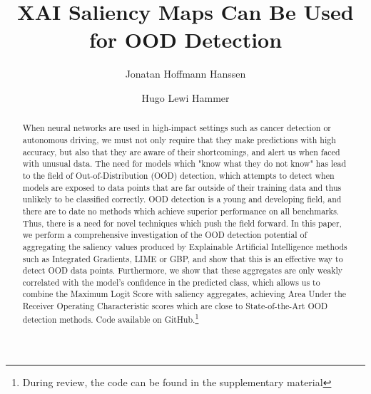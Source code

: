 \documentclass[runningheads]{llncs}
\begin{document}
\title{XAI Saliency Maps Can Be Used for OOD Detection} 



\author{%
    Jonatan Hoffmann Hanssen
    \and Hugo Lewi Hammer 
}




\maketitle


\begin{abstract}
    When neural networks are used in high-impact settings such as cancer detection or autonomous driving, we must not only require that they make predictions with high accuracy, but also that they are aware of their shortcomings, and alert us when faced with unusual data. The need for models which "know what they do not know" has lead to the field of Out-of-Distribution (OOD) detection, which attempts to detect when models are exposed to data points that are far outside of their training data and thus unlikely to be classified correctly. OOD detection is a young and developing field, and there are to date no methods which achieve superior performance on all benchmarks. Thus, there is a need for novel techniques which push the field forward. In this paper, we perform a comprehensive investigation of the OOD detection potential of aggregating the saliency values produced by Explainable Artificial Intelligence methods such as Integrated Gradients, LIME or GBP, and show that this is an effective way to detect OOD data points. Furthermore, we show that these aggregates are only weakly correlated with the model's confidence in the predicted class, which allows us to combine the Maximum Logit Score with saliency aggregates, achieving Area Under the Receiver Operating Characteristic scores which are close to State-of-the-Art OOD detection methods. Code available on GitHub.\footnote{During review, the code can be found in the supplementary material}

\end{abstract}
\end{document}
